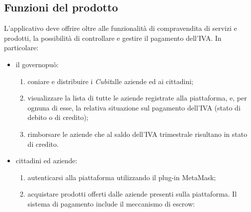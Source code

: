 \subsection{Funzioni del prodotto}
L'applicativo deve offrire oltre alle funzionalità di compravendita di servizi e prodotti, la possibilità di controllare e gestire il pagamento dell'IVA. In particolare: 
\begin{itemize}
	\item il governo\glosp può:
	\begin{enumerate}[label=\alph*.]
		\item coniare e distribuire i \textit{Cubit}\glosp alle aziende ed ai cittadini;
		\item visualizzare la lista di tutte le aziende registrate alla piattaforma, e, per ognuna di esse, la relativa situazione sul pagamento dell'IVA (stato di debito o di credito); 
		\item rimborsare le aziende che al saldo dell'IVA trimestrale risultano in stato di credito.
	\end{enumerate}
	\item cittadini ed aziende:
	\begin{enumerate}[label=\alph*.]
		\item autenticarsi alla piattaforma utilizzando il plug-in MetaMask\glo;
		\item acquistare prodotti offerti dalle aziende presenti sulla piattaforma. Il sistema di pagamento include il meccanismo di escrow\glo:
		

\end{enumerate}
\end{itemize}
